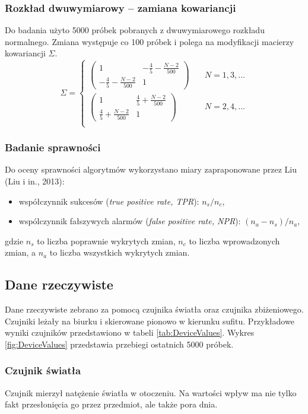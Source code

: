 \subsubsection*{Rozkład dwuwymiarowy -- zamiana kowariancji}
Do badania użyto 5000 próbek pobranych z dwuwymiarowego rozkładu normalnego.
Zmiana występuje co 100 próbek
i polega na modyfikacji macierzy kowariancji $\Sigma$.
\[ \Sigma =
  \begin{cases}
    \begin{pmatrix} 1 & -\frac{4}{5} - \frac{N-2}{500} \\ -\frac{4}{5} - \frac{N-2}{500} & 1 \end{pmatrix} & \quad N = 1,3,\ldots\\
    \begin{pmatrix} 1 & \frac{4}{5} + \frac{N-2}{500} \\ \frac{4}{5} + \frac{N-2}{500} & 1 \end{pmatrix} & \quad N = 2,4,\ldots\\
  \end{cases}
\]
\subsubsection*{Badanie sprawności}
Do oceny sprawności algorytmów wykorzystano miary zapraponowane przez Liu (Liu i in., 2013):
\begin{itemize}
  \item współczynnik sukcesów (\textit{true positive rate, TPR}): $n_{s}/n_{c}$,
  \item wspólczynnik fałszywych alarmów (\textit{false positive rate, NPR}): $(n_{a}-n_{s})/n_{a}$,
\end{itemize}
gdzie $n_{s}$ to liczba poprawnie wykrytych zmian, $n_{c}$ to liczba wprowadzonych zmian,
a $n_{a}$ to liczba wszystkich wykrytych zmian.

\subsection*{Dane rzeczywiste}
Dane rzeczywiste zebrano za pomocą czujnika światła oraz czujnika zbiżeniowego.
Czujniki leżały na biurku i skierowane pionowo w kierunku sufitu.
Przykładowe wyniki czujników przedstawiono w tabeli \ref{tab:DeviceValues}.
Wykres \ref{fig:DeviceValues} przedstawia przebiegi ostatnich 5000 próbek.
\subsubsection*{Czujnik światła}
Czujnik mierzył natężenie światła w otoczeniu.
Na wartości wpływ ma nie tylko fakt przesłonięcia go przez przedmiot,
ale także pora dnia.
